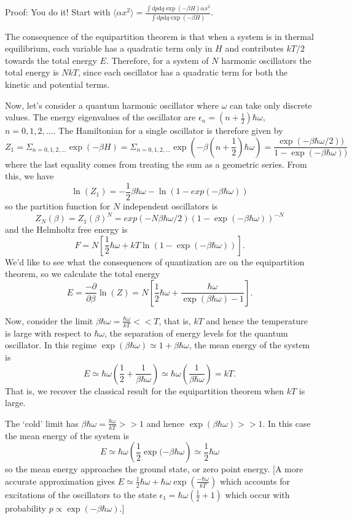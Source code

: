 Proof: You do it! Start with $\langle\alpha x^2\rangle = \frac{\int \mathrm{d}p\mathrm{d}q \exp(-\beta H)\alpha x^2}{\int \mathrm{d}p\mathrm{d}q \exp(-\beta H)}$.

The consequence of the equipartition theorem is that when a system is in thermal equilibrium, each variable has a quadratic term only in $H$ and contributes $kT/2$ towards the total energy $E$. Therefore, for a system of $N$ harmonic oscillators the total energy is $NkT$, since each oscillator has a quadratic term for both the kinetic and potential terms.

Now, let's consider a quantum harmonic oscillator where $\omega$ can take only discrete values. The energy eigenvalues of the oscillator are $\epsilon_n = (n+\frac12)\hbar\omega$, $n=0,1,2,\ldots$. The Hamiltonian for a single oscillator is therefore given by
\[
	Z_1 = \Sigma_{n=0,1,2,\ldots}\exp(-\beta H) =  \Sigma_{n=0,1,2,\ldots}\exp(-\beta(n+\frac12)\hbar\omega) = \frac{\exp(-\beta\hbar\omega/2))}{1-\exp(-\beta\hbar\omega))}
\] 
where the last equality comes from treating the sum as a geometric series.
From this, we have
\[
	\ln(Z_1) = -\frac12\beta\hbar\omega -\ln(1-exp(-\beta\hbar\omega))
\]
so the partition function for $N$ independent oscillators is
\[
	Z_N(\beta) = Z_1(\beta)^N = exp(-N\beta\hbar\omega/2)\left(1-\exp(-\beta\hbar\omega)\right)^{-N} 
\]
and the Helmholtz free energy is
\[
	F = N\left[\frac12\hbar\omega + kT\ln(1-\exp(-\beta\hbar\omega))\right].
\]
We'd like to see what the consequences of quantization are on the equipartition theorem, so we calculate the total energy
\[
	E = \frac{-\partial}{\partial \beta}\ln(Z) = N\left[\frac12 \hbar\omega + \frac{\hbar\omega}{\exp(\beta\hbar\omega) - 1}\right].
\]

Now, consider the limit $\beta\hbar\omega = \frac{\hbar\omega}{kT} << T$, that is, $kT$ and hence the temperature is large with respect to $\hbar\omega$, the separation of energy levels for the quantum oscillator. In this regime $\exp(\beta\hbar\omega)\simeq 1+\beta\hbar\omega$, the mean energy of the system is
\[
	E \simeq \hbar\omega\left(\frac12 + \frac{1}{\beta\hbar\omega}\right) \simeq \hbar\omega\left(\frac{1}{\beta\hbar\omega}\right) = kT.
\]
That is, we recover the classical result for the equipartition theorem when $kT$ is large.

The `cold' limit has $\beta\hbar\omega = \frac{\hbar\omega}{kT}>>1$ and hence $\exp(\beta\hbar\omega)>>1$. In this case the mean energy of the system is
\[
	E\simeq \hbar\omega\left(\frac12\exp(-\beta\hbar\omega\right) \simeq\frac12\hbar\omega
\]
so the mean energy approaches the ground state, or zero point energy. [A more accurate approximation gives $E\simeq \frac12\hbar\omega+\hbar\omega\exp\left(\frac{-\hbar\omega}{kT}\right)$ which accounts for excitations of the oscillators to the state $\epsilon_1 = \hbar\omega(\frac12+1)$ which occur with probability $p\propto\exp(-\beta\hbar\omega)$.]


